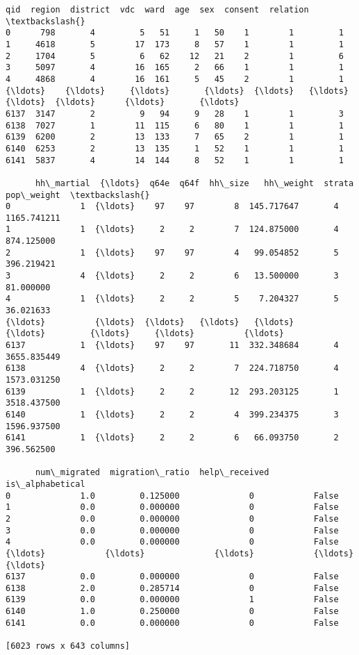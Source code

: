 \documentclass[11pt]{article}
\begin{document}
    \begin{Verbatim}[commandchars=\\\{\}]
       qid  region  district  vdc  ward  age  sex  consent  relation  \textbackslash{}
0      798       4         5   51     1   50    1        1         1
1     4618       5        17  173     8   57    1        1         1
2     1704       5         6   62    12   21    2        1         6
3     5097       4        16  165     2   66    1        1         1
4     4868       4        16  161     5   45    2        1         1
{\ldots}    {\ldots}     {\ldots}       {\ldots}  {\ldots}   {\ldots}  {\ldots}  {\ldots}      {\ldots}       {\ldots}
6137  3147       2         9   94     9   28    1        1         3
6138  7027       1        11  115     6   80    1        1         1
6139  6200       2        13  133     7   65    2        1         1
6140  6253       2        13  135     1   52    1        1         1
6141  5837       4        14  144     8   52    1        1         1

      hh\_martial  {\ldots}  q64e  q64f  hh\_size   hh\_weight  strata   pop\_weight  \textbackslash{}
0              1  {\ldots}    97    97        8  145.717647       4  1165.741211
1              1  {\ldots}     2     2        7  124.875000       4   874.125000
2              1  {\ldots}    97    97        4   99.054852       5   396.219421
3              4  {\ldots}     2     2        6   13.500000       3    81.000000
4              1  {\ldots}     2     2        5    7.204327       5    36.021633
{\ldots}          {\ldots}  {\ldots}   {\ldots}   {\ldots}      {\ldots}         {\ldots}     {\ldots}          {\ldots}
6137           1  {\ldots}    97    97       11  332.348684       4  3655.835449
6138           4  {\ldots}     2     2        7  224.718750       4  1573.031250
6139           1  {\ldots}     2     2       12  293.203125       1  3518.437500
6140           1  {\ldots}     2     2        4  399.234375       3  1596.937500
6141           1  {\ldots}     2     2        6   66.093750       2   396.562500

      num\_migrated  migration\_ratio  help\_received  is\_alphabetical
0              1.0         0.125000              0            False
1              0.0         0.000000              0            False
2              0.0         0.000000              0            False
3              0.0         0.000000              0            False
4              0.0         0.000000              0            False
{\ldots}            {\ldots}              {\ldots}            {\ldots}              {\ldots}
6137           0.0         0.000000              0            False
6138           2.0         0.285714              0            False
6139           0.0         0.000000              1            False
6140           1.0         0.250000              0            False
6141           0.0         0.000000              0            False

[6023 rows x 643 columns]
    \end{Verbatim}
\end{document}
